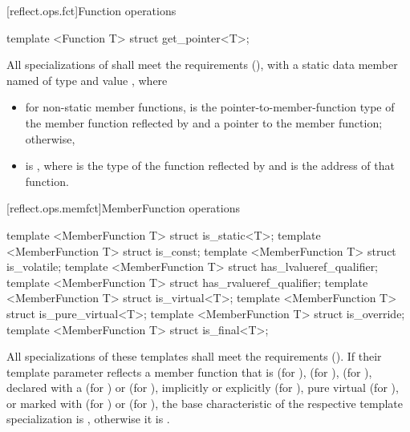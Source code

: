 [reflect.ops.fct]{Function operations}
\begin{std.txt}\color{addclr}
\begin{itemdecl}
template <Function T> struct get_pointer<T>;
\end{itemdecl}
\begin{itemdescr}
\pnum
      All specializations of  shall meet the  requirements (), with a static data member named  of type  and value , where
         \begin{itemize}
           \item for non-static member functions,  is the pointer-to-member-function type of the member function reflected by  and  a pointer to the member function; otherwise,
           \item {} is , where  is the type of the function reflected by  and  is the address of that function. 
         \end{itemize}
\end{itemdescr}
\end{std.txt}

[reflect.ops.memfct]{MemberFunction operations}
\begin{std.txt}\color{addclr}
\begin{itemdecl}
template <MemberFunction T> struct is_static<T>;
template <MemberFunction T> struct is_const;
template <MemberFunction T> struct is_volatile;
template <MemberFunction T> struct has_lvalueref_qualifier;
template <MemberFunction T> struct has_rvalueref_qualifier;
template <MemberFunction T> struct is_virtual<T>;
template <MemberFunction T> struct is_pure_virtual<T>;
template <MemberFunction T> struct is_override;
template <MemberFunction T> struct is_final<T>;
\end{itemdecl}
\begin{itemdescr}
\pnum
      All specializations of these templates shall meet the
       requirements (). If their template
      parameter reflects a member function that is  (for
      ),  (for ),
       (for ), declared with a
       \tcode{\&} (for
      ) or \tcode{\&\&} (for
      ), implicitly or explicitly 
      (for ), pure virtual (for ), or
      marked with  (for ) or 
      (for ), the base characteristic of the respective
      template specialization is , otherwise it is
      .
\end{itemdescr}
\end{std.txt}


